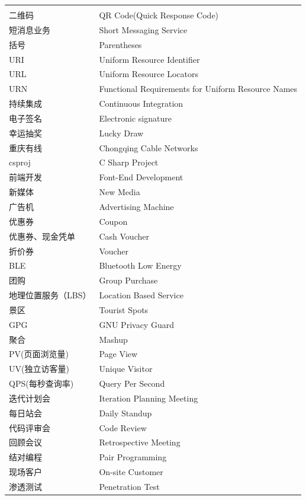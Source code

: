 \documentclass{book}
\begin{document}
\begin{longtable}{ll}
	\multirow{1}{*}{}			
	& \multicolumn{1}{c}{}\\
	二维码 & QR Code\footnotemark[1](Quick Response Code)\\
	短消息业务 & Short Messaging Service\\	
	括号 & Parentheses\\
	URI\footnotemark[2] & Uniform Resource Identifier\\
	URL\footnotemark[3] & Uniform Resource Locators\\
	URN\footnotemark[4] & Functional Requirements for Uniform Resource Names\\
	持续集成 & Continuous Integration\\	
	电子签名 & Electronic signature\\
	幸运抽奖 & Lucky Draw\\
	重庆有线 & Chongqing Cable Networks\\
	csproj & C Sharp Project\\
	前端开发 & Font-End Development\\
	新媒体 & New Media\\
	广告机 & Advertising Machine\\
	优惠券 & Coupon\\
	优惠券、现金凭单 & Cash Voucher\\
	折价券 & Voucher\\
	BLE & Bluetooth Low Energy\\
	团购 & Group Purchase\\
	地理位置服务（LBS） & Location Based Service\\
	景区 & Tourist Spots\\
	GPG & GNU Privacy Guard\\
	聚合 & Mashup\\
	PV(页面浏览量) & Page View\\
	UV(独立访客量) & Unique Visitor\\
	QPS(每秒查询率) & Query Per Second\\
	迭代计划会 & Iteration Planning Meeting\\
	每日站会 & Daily Standup\\
	代码评审会 & Code Review\\
	回顾会议 & Retrospective Meeting\\
	结对编程 & Pair Programming\\
	现场客户 & On-site Customer\\
	渗透测试 & Penetration Test\\	
\end{longtable}
\end{document}

